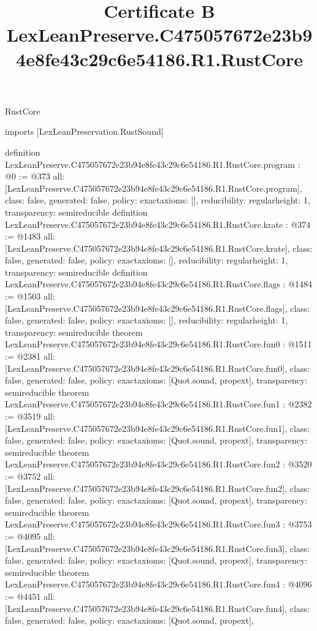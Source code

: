 \begin{lexlean}{RustCore}
\title{Certificate B LexLeanPreserve.C475057672e23b94e8fe43c29c6e54186.R1.RustCore}
\begin{coremodule}
imports [LexLeanPreservation.RustSound]

definition LexLeanPreserve.C475057672e23b94e8fe43c29c6e54186.R1.RustCore.program : @0 := @373 {
  all: [LexLeanPreserve.C475057672e23b94e8fe43c29c6e54186.R1.RustCore.program],
  class: false,
  generated: false,
  policy: exact{axioms: []},
  reducibility: regular{height: 1},
  transparency: semireducible
}
definition LexLeanPreserve.C475057672e23b94e8fe43c29c6e54186.R1.RustCore.krate : @374 := @1483 {
  all: [LexLeanPreserve.C475057672e23b94e8fe43c29c6e54186.R1.RustCore.krate],
  class: false,
  generated: false,
  policy: exact{axioms: []},
  reducibility: regular{height: 1},
  transparency: semireducible
}
definition LexLeanPreserve.C475057672e23b94e8fe43c29c6e54186.R1.RustCore.flags : @1484 := @1503 {
  all: [LexLeanPreserve.C475057672e23b94e8fe43c29c6e54186.R1.RustCore.flags],
  class: false,
  generated: false,
  policy: exact{axioms: []},
  reducibility: regular{height: 1},
  transparency: semireducible
}
theorem LexLeanPreserve.C475057672e23b94e8fe43c29c6e54186.R1.RustCore.fun0 : @1511 := @2381 {
  all: [LexLeanPreserve.C475057672e23b94e8fe43c29c6e54186.R1.RustCore.fun0],
  class: false,
  generated: false,
  policy: exact{axioms: [Quot.sound, propext]},
  transparency: semireducible
}
theorem LexLeanPreserve.C475057672e23b94e8fe43c29c6e54186.R1.RustCore.fun1 : @2382 := @3519 {
  all: [LexLeanPreserve.C475057672e23b94e8fe43c29c6e54186.R1.RustCore.fun1],
  class: false,
  generated: false,
  policy: exact{axioms: [Quot.sound, propext]},
  transparency: semireducible
}
theorem LexLeanPreserve.C475057672e23b94e8fe43c29c6e54186.R1.RustCore.fun2 : @3520 := @3752 {
  all: [LexLeanPreserve.C475057672e23b94e8fe43c29c6e54186.R1.RustCore.fun2],
  class: false,
  generated: false,
  policy: exact{axioms: [Quot.sound, propext]},
  transparency: semireducible
}
theorem LexLeanPreserve.C475057672e23b94e8fe43c29c6e54186.R1.RustCore.fun3 : @3753 := @4095 {
  all: [LexLeanPreserve.C475057672e23b94e8fe43c29c6e54186.R1.RustCore.fun3],
  class: false,
  generated: false,
  policy: exact{axioms: [Quot.sound, propext]},
  transparency: semireducible
}
theorem LexLeanPreserve.C475057672e23b94e8fe43c29c6e54186.R1.RustCore.fun4 : @4096 := @4451 {
  all: [LexLeanPreserve.C475057672e23b94e8fe43c29c6e54186.R1.RustCore.fun4],
  class: false,
  generated: false,
  policy: exact{axioms: [Quot.sound, propext]},
}
\end{coremodule}
\end{lexlean}
